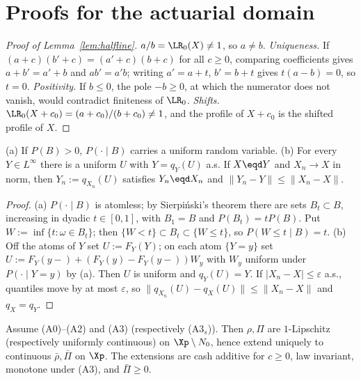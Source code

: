 \section{Proofs for the actuarial domain}\label{app:C}


\begin{proof}[Proof of Lemma~\ref{lem:halfline}]
$a/b=\LR_0(X)\ne1$, so $a\ne b$. \emph{Uniqueness.} If $(a+c)(b'+c)=(a'+c)(b+c)$ for all $c\ge0$, comparing
coefficients gives $a+b'=a'+b$ and $ab'=a'b$; writing $a'=a+t$, $b'=b+t$ gives $t(a-b)=0$, so $t=0$.
\emph{Positivity.} If $b\le0$, the pole $-b\ge0$, at which the numerator does not vanish, would contradict finiteness
of $\LR_0$. \emph{Shifts.} $\LR_0(X+c_0)=(a+c_0)/(b+c_0)\ne1$, and the profile of $X+c_0$ is the shifted profile of $X$. \qedhere
\end{proof}

\begin{lemma}\label{lem:coupling}
(a) If $P(B)>0$, $P(\cdot\mid B)$ carries a uniform random variable. (b) For every $Y\in L^\infty$ there is a uniform
$U$ with $Y=q_Y(U)$ a.s. If $X\eqd Y$ and $X_n\to X$ in norm, then $Y_n:=q_{X_n}(U)$ satisfies $Y_n\eqd X_n$ and
$\|Y_n-Y\|\le\|X_n-X\|$.
\end{lemma}

\begin{proof}
(a) $P(\cdot\mid B)$ is atomless; by Sierpi\'nski's theorem there are sets $B_t\subset B$, increasing in dyadic
$t\in[0,1]$, with $B_1=B$ and $P(B_t)=tP(B)$. Put $W:=\inf\{t:\omega\in B_t\}$; then $\{W<t\}\subset B_t\subset\{W\le t\}$,
so $P(W\le t\mid B)=t$. (b) Off the atoms of $Y$ set $U:=F_Y(Y)$; on each atom $\{Y=y\}$ set
$U:=F_Y(y-)+(F_Y(y)-F_Y(y-))W_y$ with $W_y$ uniform under $P(\cdot\mid Y=y)$ by (a). Then $U$ is uniform and
$q_Y(U)=Y$. If $|X_n-X|\le\varepsilon$ a.s., quantiles move by at most $\varepsilon$, so
$\|q_{X_n}(U)-q_X(U)\|\le\|X_n-X\|$ and $q_X=q_Y$. \qedhere
\end{proof}

\begin{lemma}[Extension]\label{lem:ext}
Assume (A0)--(A2) and (A3) (respectively (A3$_s$)). Then $\rho,\Pi$ are $1$-Lipschitz (respectively uniformly
continuous) on $\Xp\setminus N_0$, hence extend uniquely to continuous $\bar\rho,\bar\Pi$ on $\Xp$. The extensions
are cash additive for $c\ge0$, law invariant, monotone under (A3), and $\bar\Pi\ge0$.
\end{lemma}

